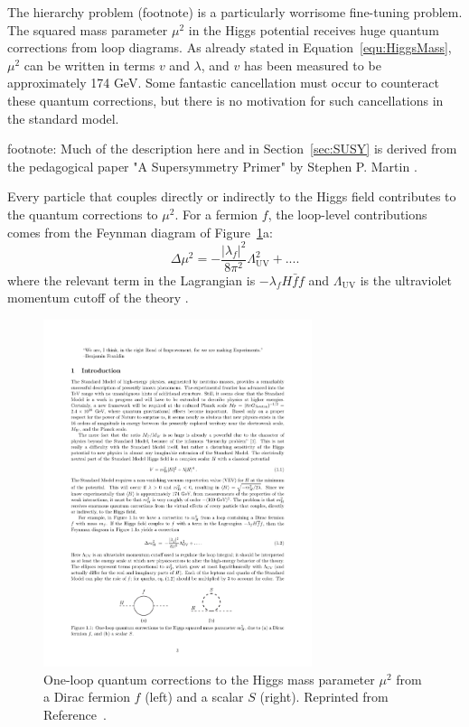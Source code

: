 The hierarchy problem (footnote) is a particularly worrisome fine-tuning problem. The squared mass parameter $\mu^2$ in the Higgs potential receives huge quantum corrections from loop diagrams. As already stated in Equation~\ref{equ:HiggsMass}, $\mu^2$ can be written in terms $v$ and $\lambda$, and $v$ has been measured to be approximately 174 GeV. Some fantastic cancellation must occur to counteract these quantum corrections, but there is no motivation for such cancellations in the standard model. 

footnote: Much of the description here and in Section~\ref{sec:SUSY} is derived from the pedagogical paper "A Supersymmetry Primer" by Stephen P. Martin \cite{SUSYprimer}.

Every particle that couples directly or indirectly to the Higgs field contributes to the quantum corrections to $\mu^2$. For a fermion $f$, the loop-level contributions comes from the Feynman diagram of Figure~\ref{fig:hierarchy}a:
\begin{equation}
\Delta\mu^2 = -\frac{|\lambda_f|^2}{8\pi^2}\Lambda^2_\mathrm{UV} + ....
\label{equ:corrFermion}
\end{equation}
where the relevant term in the Lagrangian is $-\lambda_fH\bar{f}f$ and $\Lambda_\mathrm{UV}$ is the ultraviolet momentum cutoff of the theory \cite{SUSYprimer}. 

\begin{figure}[htbp]
    \centering
    \includegraphics[width=0.7\textwidth]{Figures/Theory/hierarchyLoop.pdf}
    \caption{One-loop quantum corrections to the Higgs mass parameter $\mu^2$ from a Dirac fermion $f$ (left) and a scalar $S$ (right).
    Reprinted from Reference~\cite{SUSYprimer}.}
    \label{fig:hierarchy}
\end{figure}


